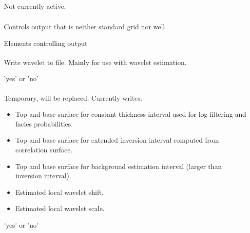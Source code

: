 \paragraph{}
 \slist
   \item \Description Not currently active.
   \item \Argument
   \item \Default
 \elist

\subsubsection{}
 \slist
   \item \Description Controls output that is neither standard grid nor well.
   \item \Argument Elements controlling output
   \item \Default
 \elist

\paragraph{}
 \slist
   \item \Description Write wavelet to file. Mainly for use with wavelet estimation.
   \item \Argument 'yes' or 'no'
   \item \Default
 \elist

\paragraph{}
 \slist
   \item \Description Temporary, will be replaced. Currently writes:
   \begin{itemize}
   \item Top and base surface for constant thickness interval used for log filtering and facies probabilities.
   \item Top and base surface for extended inversion interval computed from correlation surface.
   \item Top and base surface for background estimation interval (larger than inversion interval).
   \item Estimated local wavelet shift.
   \item Estimated local wavelet scale.
   \end{itemize}
   \item \Argument 'yes' or 'no'
   \item \Default
 \elist

